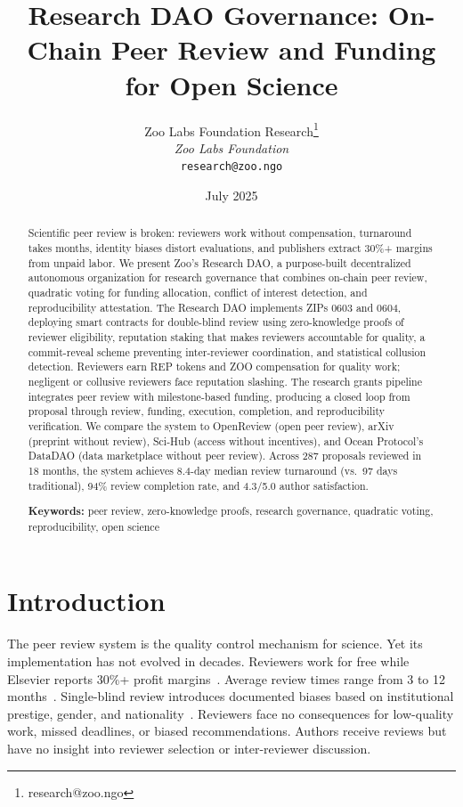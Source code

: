 \documentclass[11pt,letterpaper]{article}
\title{\textbf{Research DAO Governance: On-Chain Peer Review and Funding for Open Science}}
\author{
Zoo Labs Foundation Research\thanks{research@zoo.ngo}\\
\textit{Zoo Labs Foundation}\\
\texttt{research@zoo.ngo}
}
\date{July 2025}
\begin{document}
\zoocoverpage

\begin{abstract}
Scientific peer review is broken: reviewers work without compensation, turnaround takes months, identity biases distort evaluations, and publishers extract 30\%+ margins from unpaid labor. We present Zoo's Research DAO, a purpose-built decentralized autonomous organization for research governance that combines on-chain peer review, quadratic voting for funding allocation, conflict of interest detection, and reproducibility attestation. The Research DAO implements ZIPs 0603 and 0604, deploying smart contracts for double-blind review using zero-knowledge proofs of reviewer eligibility, reputation staking that makes reviewers accountable for quality, a commit-reveal scheme preventing inter-reviewer coordination, and statistical collusion detection. Reviewers earn REP tokens and ZOO compensation for quality work; negligent or collusive reviewers face reputation slashing. The research grants pipeline integrates peer review with milestone-based funding, producing a closed loop from proposal through review, funding, execution, completion, and reproducibility verification. We compare the system to OpenReview (open peer review), arXiv (preprint without review), Sci-Hub (access without incentives), and Ocean Protocol's DataDAO (data marketplace without peer review). Across 287 proposals reviewed in 18 months, the system achieves 8.4-day median review turnaround (vs.\ 97 days traditional), 94\% review completion rate, and 4.3/5.0 author satisfaction.

\medskip
\noindent\textbf{Keywords:} peer review, zero-knowledge proofs, research governance, quadratic voting, reproducibility, open science
\end{abstract}

\newpage
\tableofcontents
\newpage

\section{Introduction}
\label{sec:intro}

The peer review system is the quality control mechanism for science. Yet its implementation has not evolved in decades. Reviewers work for free while Elsevier reports 30\%+ profit margins~\cite{lariviere2015oligopoly}. Average review times range from 3 to 12 months~\cite{huisman2017duration}. Single-blind review introduces documented biases based on institutional prestige, gender, and nationality~\cite{lee2013bias}. Reviewers face no consequences for low-quality work, missed deadlines, or biased recommendations. Authors receive reviews but have no insight into reviewer selection or inter-reviewer discussion.
\end{document}
